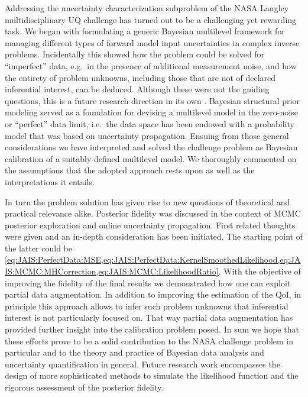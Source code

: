 Addressing the uncertainty characterization subproblem of the NASA Langley multidisciplinary UQ challenge has turned out to be a challenging yet rewarding task.
We began with formulating a generic Bayesian multilevel framework for managing different types of forward model input uncertainties in complex inverse problems.
Incidentally this showed how the problem could be solved for ``imperfect'' data, e.g.\ in the presence of additional measurement noise, 
and how the entirety of problem unknowns, including those that are not of declared inferential interest, can be deduced.
Although these were not the guiding questions, this is a future research direction in its own \cite{Nagel:PEM2016}.
Bayesian structural prior modeling served as a foundation for devising a multilevel model in the zero-noise or ``perfect'' data limit,
i.e.\ the data space has been endowed with a probability model that was based on uncertainty propagation.
Ensuing from those general considerations we have interpreted and solved the challenge problem as Bayesian calibration of a suitably defined multilevel model.
We thoroughly commented on the assumptions that the adopted approach rests upon as well as the interpretations it entails.
\par %
In turn the problem solution has given rise to new questions of theoretical and practical relevance alike.
Posterior fidelity was discussed in the context of MCMC posterior exploration and online uncertainty propagation.
First related thoughts were given and an in-depth consideration has been initiated.
The starting point of the latter could be \cref{eq:JAIS:PerfectData:MSE,eq:JAIS:PerfectData:KernelSmoothedLikelihood,eq:JAIS:MCMC:MHCorrection,eq:JAIS:MCMC:LikelihoodRatio}.
With the objective of improving the fidelity of the final results we demonstrated how one can exploit partial data augmentation.
In addition to improving the estimation of the QoI, in principle this approach allows to infer such problem unknowns that inferential interest is not particularly focused on.
That way partial data augmentation has provided further insight into the calibration problem posed.
In sum we hope that these efforts prove to be a solid contribution to the NASA challenge problem in particular and to the theory and practice of Bayesian data analysis and uncertainty quantification in general.
Future research work encompasses the design of more sophisticated methods to simulate the likelihood function and the rigorous assessment of the posterior fidelity.